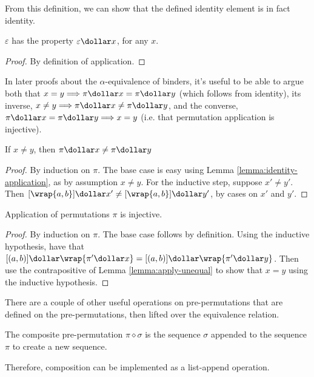 From this definition, we can show that the defined identity element is in fact identity.

\begin{lemma}
\label{lemma:identity-application}
\(\varepsilon\) has the property \(\varepsilon \dollar x\), for any \(x\).
\end{lemma}
\begin{proof}
By definition of application.
\end{proof}

In later proofs about the \(\alpha\)-equivalence of binders, it's useful to be able to argue both that \(x = y \Longrightarrow \pi \dollar x = \pi \dollar y\) (which follows from identity), its inverse, \(x \neq y \Longrightarrow \pi \dollar x \neq \pi \dollar y\), and the converse, \(\pi \dollar x = \pi \dollar y \Longrightarrow x = y\) (i.e. that permutation application is injective).

\begin{lemma}
\label{lemma:apply-unequal}
If \(x \neq y\), then \(\pi \dollar x \neq \pi \dollar y\)
\end{lemma}
\begin{proof}
By induction on \(\pi\).
The base case is easy using Lemma \ref{lemma:identity-application}, as by assumption \(x \neq y\).
For the inductive step, suppose \(x' \neq y'\).
Then \([\wrap{a, b}] \dollar x' \neq [\wrap{a, b}] \dollar y'\), by cases on \(x'\) and \(y'\).
\end{proof}

\begin{lemma}
Application of permutations \(\pi\) is injective.
\end{lemma}
\begin{proof}
By induction on \(\pi\).
The base case follows by definition.
Using the inductive hypothesis, have that \([(a, b)] \dollar \wrap{\pi' \dollar x} = [(a, b)] \dollar \wrap{\pi' \dollar y}\).
Then use the contrapositive of Lemma \ref{lemma:apply-unequal} to show that \(x = y\) using the inductive hypothesis.
\end{proof}

There are a couple of other useful operations on pre-permutations that are defined on the pre-permutations, then lifted over the equivalence relation.

\begin{definition}
The composite pre-permutation \(\pi \diamond \sigma\) is the sequence \(\sigma\) appended to the sequence \(\pi\) to create a new sequence.
\end{definition}
Therefore, composition can be implemented as a list-append operation.

